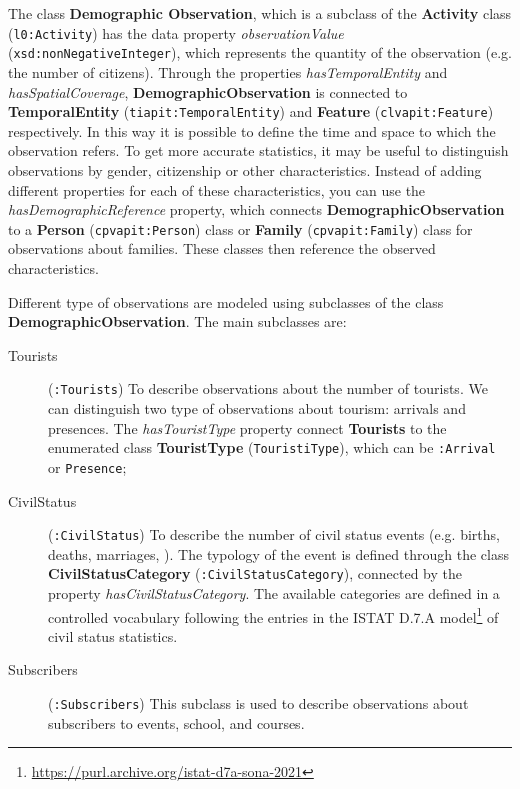 The class \textbf{Demographic Observation}, which is a subclass of the \textbf{Activity} class (\verb#l0:Activity#) has the data property \textit{observationValue} (\verb#xsd:nonNegativeInteger#), which represents the quantity of the observation (e.g. the number of citizens). Through the properties \textit{hasTemporalEntity} and \textit{hasSpatialCoverage}, \textbf{DemographicObservation} is connected to \textbf{TemporalEntity} (\verb#tiapit:TemporalEntity#) and \textbf{Feature} (\verb#clvapit:Feature#) respectively. In this way it is possible to define the time and space to which the observation refers. To get more accurate statistics, it may be useful to distinguish observations by gender, citizenship or other characteristics. Instead of adding different properties for each of these characteristics, you can use the \textit{hasDemographicReference} property, which connects \textbf{DemographicObservation} to a \textbf{Person} (\verb#cpvapit:Person#) class or \textbf{Family} (\verb#cpvapit:Family#) class for observations about families. These classes then reference the observed characteristics.

Different type of observations are modeled using subclasses of the class \textbf{DemographicObservation}. The main subclasses are:

\begin{description}
  \item[Tourists]  (\verb#:Tourists#) To describe observations about the number of tourists. We can distinguish two type of observations about tourism: arrivals and presences. The \textit{hasTouristType} property connect \textbf{Tourists} to the enumerated class \textbf{TouristType} (\verb#TouristiType#), which can be \verb#:Arrival# or \verb#Presence#;
  \item[CivilStatus]  (\verb#:CivilStatus#) To describe the number of civil status events (e.g. births, deaths, marriages, \etc). The typology of the event is defined through the class \textbf{CivilStatusCategory} (\verb#:CivilStatusCategory#), connected by the property \textit{hasCivilStatusCategory}. The available categories are defined in a controlled vocabulary following the entries in the ISTAT D.7.A model\footnote{\url{https://purl.archive.org/istat-d7a-sona-2021}} of civil status statistics.
  \item[Subscribers] (\verb#:Subscribers#) This subclass is used to describe observations about subscribers to events, school, and courses.
\end{description}

